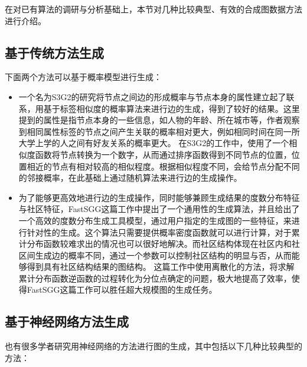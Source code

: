 在对已有算法的调研与分析基础上，本节对几种比较典型、有效的合成图数据方法进行介绍。

\subsection{基于传统方法生成}

下面两个方法可以基于概率模型进行生成：

\begin{itemize}
  \item 一个名为S3G2\cite{Minh2012S3G2}的研究将节点之间边的形成概率与节点本身的属性建立起了联系，用基于标签相似度的概率算法来进行边的生成，得到了较好的结果。这里提到的属性是指节点本身的一些信息，如人物的年龄、所在城市等，作者观察到相同属性标签的节点之间产生关联的概率相对更大，例如相同时间在同一所大学上学的人之间有好友关系的概率更大。
  在S3G2的工作中，使用了一个相似度函数将节点转换为一个数字，从而通过排序函数得到不同节点的位置，位置相近的节点有相对较高的相似程度。根据相似程度不同，会给节点分配不同的邻接概率，在此基础上通过随机算法来进行边的生成操作。
  \item 为了能够更高效地进行边的生成操作，同时能够兼顾生成结果的度数分布特征与社区特征，FastSGG\cite{FastSGG}这篇工作中提出了一个通用性的生成算法，并且给出了一个高效的度数分布生成工具模型，通过用户指定的生成图的一些特征，来进行针对性的生成。这个算法只需要提供概率密度函数就可以进行计算，对于累计分布函数较难求出的情况也可以很好地解决。而社区结构体现在社区内和社区间生成边的概率不同，通过一个参数可以控制社区结构的明显与否，从而能够得到具有社区结构结果的图结构。
  这篇工作中使用离散化的方法，将求解累计分布函数逆函数的过程转化为分位点确定的问题，极大地提高了效率，使得FastSGG这篇工作可以胜任超大规模图的生成任务。
\end{itemize}

\vspace{0.2cm}

\subsection{基于神经网络方法生成}

也有很多学者研究用神经网络的方法进行图的生成，其中包括以下几种比较典型的方法：

